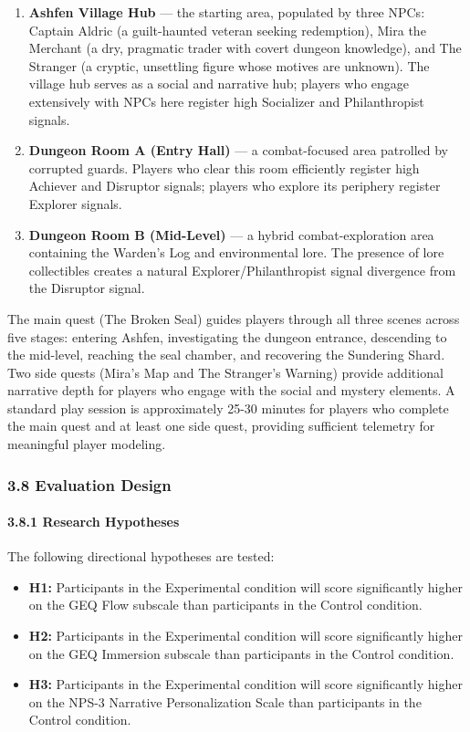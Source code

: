 \begin{enumerate}
\def\labelenumi{\arabic{enumi}.}
\item
  \textbf{Ashfen Village Hub} --- the starting area, populated by three
  NPCs: Captain Aldric (a guilt-haunted veteran seeking redemption),
  Mira the Merchant (a dry, pragmatic trader with covert dungeon
  knowledge), and The Stranger (a cryptic, unsettling figure whose
  motives are unknown). The village hub serves as a social and narrative
  hub; players who engage extensively with NPCs here register high
  Socializer and Philanthropist signals.
\item
  \textbf{Dungeon Room A (Entry Hall)} --- a combat-focused area
  patrolled by corrupted guards. Players who clear this room efficiently
  register high Achiever and Disruptor signals; players who explore its
  periphery register Explorer signals.
\item
  \textbf{Dungeon Room B (Mid-Level)} --- a hybrid combat-exploration
  area containing the Warden's Log and environmental lore. The presence
  of lore collectibles creates a natural Explorer/Philanthropist signal
  divergence from the Disruptor signal.
\end{enumerate}

The main quest (The Broken Seal) guides players through all three scenes
across five stages: entering Ashfen, investigating the dungeon entrance,
descending to the mid-level, reaching the seal chamber, and recovering
the Sundering Shard. Two side quests (Mira's Map and The Stranger's
Warning) provide additional narrative depth for players who engage with
the social and mystery elements. A standard play session is
approximately 25-30 minutes for players who complete the main quest and
at least one side quest, providing sufficient telemetry for meaningful
player modeling.

\subsubsection{3.8 Evaluation Design}\label{evaluation-design}

\paragraph{3.8.1 Research Hypotheses}\label{research-hypotheses}

The following directional hypotheses are tested:

\begin{itemize}
\tightlist
\item
  \textbf{H1:} Participants in the Experimental condition will score
  significantly higher on the GEQ Flow subscale than participants in the
  Control condition.
\item
  \textbf{H2:} Participants in the Experimental condition will score
  significantly higher on the GEQ Immersion subscale than participants
  in the Control condition.
\item
  \textbf{H3:} Participants in the Experimental condition will score
  significantly higher on the NPS-3 Narrative Personalization Scale than
  participants in the Control condition.
\end{itemize}

